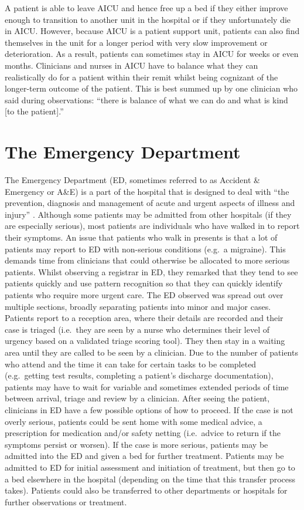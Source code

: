 \documentclass[a4paper, nobind]{templates/ociamthesis}
\begin{document}
\hfill\break
A patient is able to leave AICU and hence free up a bed if they either improve enough to transition to another unit in the hospital or if they unfortunately die in AICU. However, because AICU is a patient support unit, patients can also find themselves in the unit for a longer period with very slow improvement or deterioration. As a result, patients can sometimes stay in AICU for weeks or even months. Clinicians and nurses in AICU have to balance what they can realistically do for a patient within their remit whilst being cognizant of the longer-term outcome of the patient. This is best summed up by one clinician who said during observations: ``there is balance of what we can do and what is kind {[}to the patient{]}.''

\section{The Emergency Department}\label{the-emergency-department}

The Emergency Department (ED, sometimes referred to as Accident \& Emergency or A\&E) is a part of the hospital that is designed to deal with ``the prevention, diagnosis and management of acute and urgent aspects of illness and injury'' \autocite{noauthor_about_2024}. Although some patients may be admitted from other hospitals (if they are especially serious), most patients are individuals who have walked in to report their symptoms. An issue that patients who walk in presents is that a lot of patients may report to ED with non-serious conditions (e.g.~a migraine). This demands time from clinicians that could otherwise be allocated to more serious patients. Whilst observing a registrar in ED, they remarked that they tend to see patients quickly and use pattern recognition so that they can quickly identify patients who require more urgent care. The ED observed was spread out over multiple sections, broadly separating patients into minor and major cases. Patients report to a reception area, where their details are recorded and their case is triaged (i.e.~they are seen by a nurse who determines their level of urgency based on a validated triage scoring tool). They then stay in a waiting area until they are called to be seen by a clinician. Due to the number of patients who attend and the time it can take for certain tasks to be completed (e.g.~getting test results, completing a patient's discharge documentation), patients may have to wait for variable and sometimes extended periods of time between arrival, triage and review by a clinician. After seeing the patient, clinicians in ED have a few possible options of how to proceed. If the case is not overly serious, patients could be sent home with some medical advice, a prescription for medication and/or safety netting (i.e.~advice to return if the symptoms persist or worsen). If the case is more serious, patients may be admitted into the ED and given a bed for further treatment. Patients may be admitted to ED for initial assessment and initiation of treatment, but then go to a bed elsewhere in the hospital (depending on the time that this transfer process takes). Patients could also be transferred to other departments or hospitals for further observations or treatment.
\end{document}
